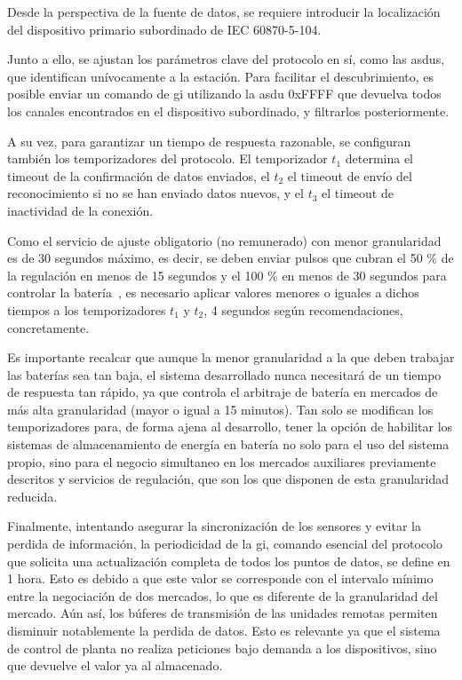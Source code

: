 Desde la perspectiva de la fuente de datos, se requiere introducir la localización del dispositivo primario subordinado de IEC 60870-5-104.

Junto a ello, se ajustan los parámetros clave del protocolo en sí, como las \glspl{asdu}, que identifican unívocamente a la estación. Para facilitar el descubrimiento, es posible enviar un comando de \gls{gi} utilizando la \gls{asdu} 0xFFFF que devuelva todos los canales encontrados en el dispositivo subordinado, y filtrarlos posteriormente.

A su vez, para garantizar un tiempo de respuesta razonable, se configuran también los temporizadores del protocolo. El temporizador \( t_1 \) determina el timeout de la confirmación de datos enviados, el \( t_2 \) el timeout de envío del reconocimiento si no se han enviado datos nuevos, y el \( t_3 \) el timeout de inactividad de la conexión.

Como el servicio de ajuste obligatorio (no remunerado) con menor granularidad es de 30 segundos máximo, es decir, se deben enviar pulsos que cubran el 50 \% de la regulación en menos de 15 segundos y el 100 \% en menos de 30 segundos para controlar la batería~\cite{cnmc2024balance}, es necesario aplicar valores menores o iguales a dichos tiempos a los temporizadores \( t_1 \) y \( t_2 \), 4 segundos según recomendaciones, concretamente.

Es importante recalcar que aunque la menor granularidad a la que deben trabajar las baterías sea tan baja, el sistema desarrollado nunca necesitará de un tiempo de respuesta tan rápido, ya que controla el arbitraje de batería en mercados de más alta granularidad (mayor o igual a 15 minutos). Tan solo se modifican los temporizadores para, de forma ajena al desarrollo, tener la opción de habilitar los sistemas de almacenamiento de energía en batería no solo para el uso del sistema propio, sino para el negocio simultaneo en los mercados auxiliares previamente descritos y servicios de regulación, que son los que disponen de esta granularidad reducida.

Finalmente, intentando asegurar la sincronización de los sensores y evitar la perdida de información, la periodicidad de la \gls{gi}, comando esencial del protocolo que solicita una actualización completa de todos los puntos de datos, se define en 1 hora. Esto es debido a que este valor se corresponde con el intervalo mínimo entre la negociación de dos mercados, lo que es diferente de la granularidad del mercado. Aún así, los búferes de transmisión de las unidades remotas permiten disminuir notablemente la perdida de datos. Esto es relevante ya que el sistema de control de planta no realiza peticiones bajo demanda a los dispositivos, sino que devuelve el valor ya al almacenado.

